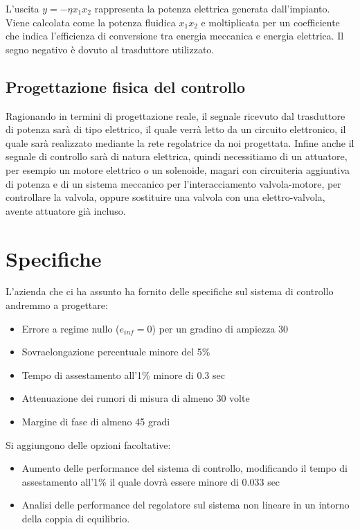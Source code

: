 \documentclass{article}
\begin{document}
L'uscita $y=-\eta x_1 x_2$ rappresenta la potenza elettrica generata dall'impianto. Viene calcolata come la potenza fluidica $x_1 x_2$ e moltiplicata per un coefficiente che indica l'efficienza di conversione tra energia meccanica e energia elettrica. Il segno negativo è dovuto al trasduttore utilizzato.

\subsection{Progettazione fisica del controllo}

Ragionando in termini di progettazione reale, il segnale ricevuto dal trasduttore di potenza sarà di tipo elettrico, il quale verrà letto da un circuito elettronico, il quale sarà realizzato mediante la rete regolatrice da noi progettata. 
Infine anche il segnale di controllo sarà di natura elettrica, quindi necessitiamo di un attuatore, per esempio un motore elettrico o un solenoide, magari con circuiteria aggiuntiva di potenza e di un sistema meccanico per l'interacciamento valvola-motore, per controllare la valvola, oppure sostituire una valvola con una elettro-valvola, avente attuatore già incluso.

\section{Specifiche}

L'azienda che ci ha assunto ha fornito delle specifiche sul sistema di controllo andremmo a progettare:

\begin{itemize}
    \item Errore a regime nullo ($e_{inf}=0$) per un gradino di ampiezza 30
    \item Sovraelongazione percentuale minore del 5\%
    \item Tempo di assestamento all'1\% minore di 0.3 sec
    \item Attenuazione dei rumori di misura di almeno 30 volte
    \item Margine di fase di almeno 45 gradi
\end{itemize}

Si aggiungono delle opzioni facoltative:
\begin{itemize}
    \item Aumento delle performance del sistema di controllo, modificando il tempo di assestamento all'1\% il quale dovrà essere minore di 0.033 sec
    \item Analisi delle performance del regolatore sul sistema non lineare in un intorno della coppia di equilibrio.
\end{itemize}
\end{document}
